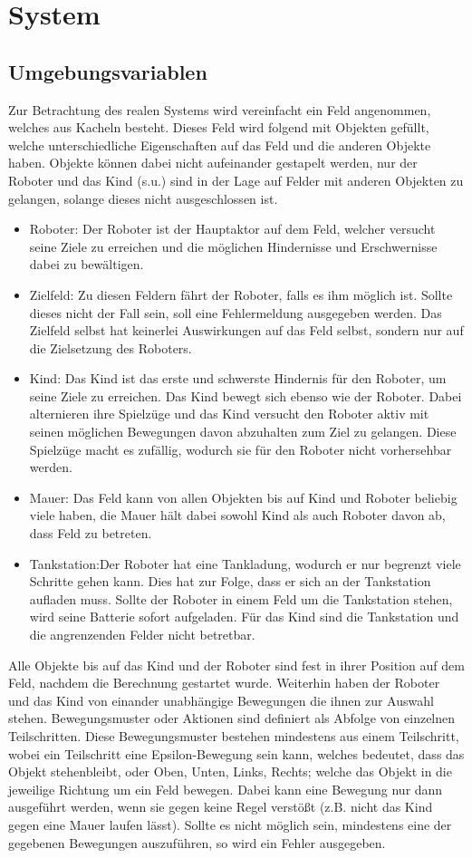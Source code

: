 \section{System}
\subsection{Umgebungsvariablen}
Zur Betrachtung des realen Systems wird vereinfacht ein Feld angenommen, welches aus Kacheln besteht. Dieses Feld wird folgend mit Objekten gefüllt, welche unterschiedliche Eigenschaften auf das Feld und die anderen Objekte haben. Objekte können dabei nicht aufeinander gestapelt werden, nur der Roboter und das Kind (s.u.) sind in der Lage auf Felder mit anderen Objekten zu gelangen, solange dieses nicht ausgeschlossen ist.
\begin{itemize}
	\item Roboter: Der Roboter ist der Hauptaktor auf dem Feld, welcher versucht seine Ziele zu erreichen und die möglichen Hindernisse und Erschwernisse dabei zu bewältigen.
	\item Zielfeld: Zu diesen Feldern fährt der Roboter, falls es ihm möglich ist. Sollte dieses nicht der Fall sein, soll eine Fehlermeldung ausgegeben werden. Das Zielfeld selbst hat keinerlei Auswirkungen auf das Feld selbst, sondern nur auf die Zielsetzung des Roboters.
	\item Kind: Das Kind ist das erste und schwerste Hindernis für den Roboter, um seine Ziele zu erreichen. Das Kind bewegt sich ebenso wie der Roboter. Dabei alternieren ihre Spielzüge und das Kind versucht den Roboter aktiv mit seinen möglichen Bewegungen davon abzuhalten zum Ziel zu gelangen. Diese Spielzüge macht es zufällig, wodurch sie für den Roboter nicht vorhersehbar werden.
	\item Mauer: Das Feld kann von allen Objekten bis auf Kind und Roboter beliebig viele haben, die Mauer hält dabei sowohl Kind als auch Roboter davon ab, dass Feld zu betreten.
	\item Tankstation:Der Roboter hat eine Tankladung, wodurch er nur begrenzt viele Schritte gehen kann. Dies hat zur Folge, dass er sich an der Tankstation aufladen muss. Sollte der Roboter in einem Feld um die Tankstation stehen, wird seine Batterie sofort aufgeladen. Für das Kind sind die Tankstation und die angrenzenden Felder nicht betretbar.
\end{itemize}
Alle Objekte bis auf das Kind und der Roboter sind fest in ihrer Position auf dem Feld, nachdem die Berechnung gestartet wurde. Weiterhin haben der Roboter und das Kind von einander unabhängige Bewegungen die ihnen zur Auswahl stehen. Bewegungsmuster oder Aktionen sind definiert als Abfolge von einzelnen Teilschritten. Diese Bewegungsmuster bestehen mindestens aus einem Teilschritt, wobei ein Teilschritt eine Epsilon-Bewegung sein kann, welches bedeutet, dass das Objekt stehenbleibt, oder Oben, Unten, Links, Rechts; welche das Objekt in die jeweilige Richtung um ein Feld bewegen. Dabei kann eine Bewegung nur dann ausgeführt werden, wenn sie gegen keine Regel verstößt (z.B. nicht das Kind gegen eine Mauer laufen lässt). Sollte es nicht möglich sein, mindestens eine der gegebenen Bewegungen auszuführen, so wird ein Fehler ausgegeben. \\
